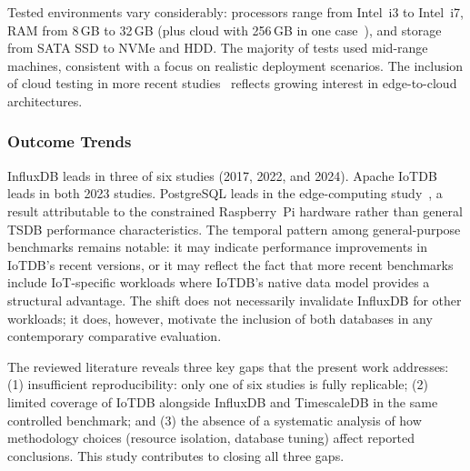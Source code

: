 Tested environments vary considerably: processors range
from Intel~i3 to Intel~i7, RAM from 8\,GB to 32\,GB (plus cloud with 256\,GB in one
case~\citep{wang2023iotdb}), and storage from SATA SSD to NVMe and HDD. The majority of
tests used mid-range machines, consistent with a focus on realistic deployment scenarios.
The inclusion of cloud testing in more recent studies~\citep{pereira2023mulletbench,wang2023iotdb}
reflects growing interest in edge-to-cloud architectures.

\subsubsection{Outcome Trends}

InfluxDB leads in three of six studies (2017, 2022, and 2024).
Apache IoTDB leads in both 2023 studies. PostgreSQL leads in the edge-computing
study~\citep{grzesik2020comparative}, a result attributable to the constrained Raspberry~Pi
hardware rather than general TSDB performance characteristics. The temporal pattern among
general-purpose benchmarks remains notable: it may indicate performance improvements in
IoTDB's recent versions, or it may reflect the fact that more recent benchmarks include
IoT-specific workloads where IoTDB's native data model provides a structural advantage.
The shift does not necessarily invalidate InfluxDB for other workloads; it does, however,
motivate the inclusion of both databases in any contemporary comparative evaluation.

The reviewed literature reveals three key gaps that the present work addresses:
(1) insufficient reproducibility: only one of six studies is fully replicable; (2) limited
coverage of IoTDB alongside InfluxDB and TimescaleDB in the same controlled benchmark; and
(3) the absence of a systematic analysis of how methodology choices (resource isolation,
database tuning) affect reported conclusions. This study contributes to closing all three gaps.

